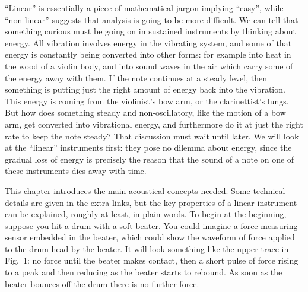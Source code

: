   ``Linear'' is essentially a piece of mathematical jargon implying ``easy'', 
  while ``non-linear'' suggests that analysis is going to be more difficult. We 
  can tell that something curious must be going on in sustained instruments by 
  thinking about energy. All vibration involves energy in the vibrating system, 
  and some of that energy is constantly being converted into other forms: for 
  example into heat in the wood of a violin body, and into sound waves in the 
  air which carry some of the energy away with them. If the note continues at a 
  steady level, then something is putting just the right amount of energy back 
  into the vibration. This energy is coming from the violinist's bow arm, or 
  the clarinettist's lungs. But how does something steady and non-oscillatory, 
  like the motion of a bow arm, get converted into vibrational energy, and 
  furthermore do it at just the right rate to keep the note steady? That 
  discussion must wait until later. We will look at the ``linear'' instruments 
  first: they pose no dilemma about energy, since the gradual loss of energy is 
  precisely the reason that the sound of a note on one of these instruments 
  dies away with time. 

  This chapter introduces the main acoustical concepts needed. Some technical 
  details are given in the extra links, but the key properties of a linear 
  instrument can be explained, roughly at least, in plain words. To begin at 
  the beginning, suppose you hit a drum with a soft beater. You could imagine a 
  force-measuring sensor embedded in the beater, which could show the waveform 
  of force applied to the drum-head by the beater. It will look something like 
  the upper trace in Fig.\ 1: no force until the beater makes contact, then a 
  short pulse of force rising to a peak and then reducing as the beater starts 
  to rebound. As soon as the beater bounces off the drum there is no further 
  force. 



